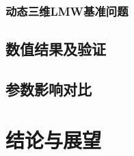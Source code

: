 \documentclass[master,xetex]{thuthesis}
\begin{document}
\subsection{动态三维LMW基准问题}
\section{数值结果及验证}
\section{参数影响对比}

\chapter{结论与展望}


\backmatter







%
\end{document}
